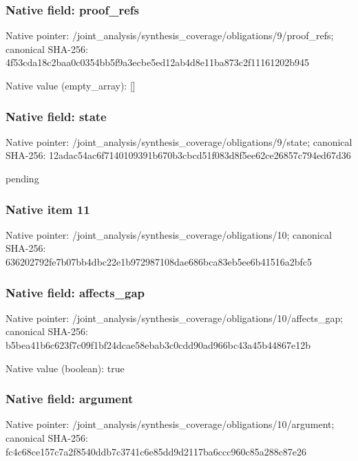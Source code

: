 \documentclass[10pt,a4paper]{article}
\begin{document}
\subsubsection{Native field: proof\_\allowbreak{}refs}
Native pointer: /joint\_\allowbreak{}analysis/synthesis\_\allowbreak{}coverage/obligations/9/proof\_\allowbreak{}refs; canonical SHA-256: 4f53cda18c2baa0c0354bb5f9a3ecbe5ed12ab4d8e11ba873c2f11161202b945

Native value (empty\_\allowbreak{}array): []

\subsubsection{Native field: state}
Native pointer: /joint\_\allowbreak{}analysis/synthesis\_\allowbreak{}coverage/obligations/9/state; canonical SHA-256: 12adac54ac6f7140109391b670b3cbcd51f083d8f5ee62ce26857c794ed67d36

\begingroup\raggedright\sloppy pending\par\endgroup

\subsubsection{Native item 11}
Native pointer: /joint\_\allowbreak{}analysis/synthesis\_\allowbreak{}coverage/obligations/10; canonical SHA-256: 636202792fe7b07bb4dbc22e1b972987108dae686bca83eb5ee6b41516a2bfc5

\subsubsection{Native field: affects\_\allowbreak{}gap}
Native pointer: /joint\_\allowbreak{}analysis/synthesis\_\allowbreak{}coverage/obligations/10/affects\_\allowbreak{}gap; canonical SHA-256: b5bea41b6c623f7c09f1bf24dcae58ebab3c0cdd90ad966bc43a45b44867e12b

Native value (boolean): true

\subsubsection{Native field: argument}
Native pointer: /joint\_\allowbreak{}analysis/synthesis\_\allowbreak{}coverage/obligations/10/argument; canonical SHA-256: fc4c68ce157c7a2f8540ddb7c3741c6e85dd9d2117ba6ccc960c85a288c87e26
\end{document}
